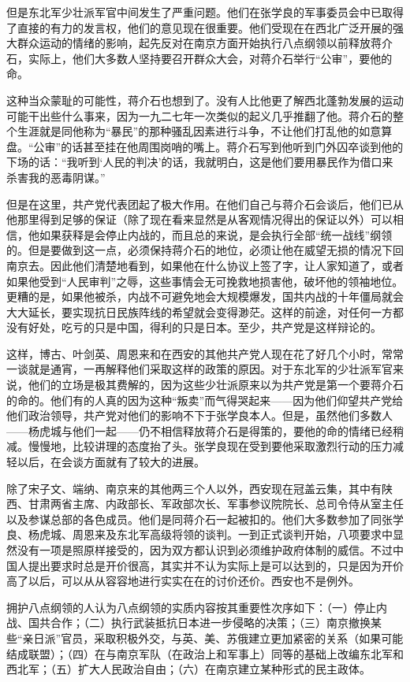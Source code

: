 \documentclass[10pt]{book}
\begin{document}
但是东北军少壮派军官中间发生了严重问题。他们在张学良的军事委员会中已取得了直接的有力的发言权，他们的意见现在很重要。他们受现在在西北广泛开展的强大群众运动的情绪的影响，起先反对在南京方面开始执行八点纲领以前释放蒋介石，实际上，他们大多数人坚持要召开群众大会，对蒋介石举行“公审”，要他的命。

这种当众蒙耻的可能性，蒋介石也想到了。没有人比他更了解西北蓬勃发展的运动可能干出些什么事来，因为一九二七年一次类似的起义几乎推翻了他。蒋介石的整个生涯就是同他称为“暴民”的那种骚乱因素进行斗争，不让他们打乱他的如意算盘。“公审”的话甚至挂在他周围岗哨的嘴上。蒋介石写到他听到门外囚卒谈到他的下场的话：“我听到‘人民的判决’的话，我就明白，这是他们要用暴民作为借口来杀害我的恶毒阴谋。”

但是在这里，共产党代表团起了极大作用。在他们自己与蒋介石会谈后，他们已从他那里得到足够的保证（除了现在看来显然是从客观情况得出的保证以外）可以相信，他如果获释是会停止内战的，而且总的来说，是会执行全部“统一战线”纲领的。但是要做到这一点，必须保持蒋介石的地位，必须让他在威望无损的情况下回南京去。因此他们清楚地看到，如果他在什么协议上签了字，让人家知道了，或者如果他受到“人民审判”之辱，这些事情会无可挽救地损害他，破坏他的领袖地位。更糟的是，如果他被杀，内战不可避免地会大规模爆发，国共内战的十年僵局就会大大延长，要实现抗日民族阵线的希望就会变得渺茫。这样的前途，对任何一方都没有好处，吃亏的只是中国，得利的只是日本。至少，共产党是这样辩论的。

这样，博古、叶剑英、周恩来和在西安的其他共产党人现在花了好几个小时，常常一谈就是通宵，一再解释他们采取这样的政策的原因。对于东北军的少壮派军官来说，他们的立场是极其费解的，因为这些少壮派原来以为共产党是第一个要蒋介石的命的。他们有的人真的因为这种“叛卖”而气得哭起来——因为他们仰望共产党给他们政治领导，共产党对他们的影响不下于张学良本人。但是，虽然他们多数人——杨虎城与他们一起——仍不相信释放蒋介石是得策的，要他的命的情绪已经稍减。慢慢地，比较讲理的态度抬了头。张学良现在受到要他采取激烈行动的压力减轻以后，在会谈方面就有了较大的进展。

除了宋子文、端纳、南京来的其他两三个人以外，西安现在冠盖云集，其中有陕西、甘肃两省主席、内政部长、军政部次长、军事参议院院长、总司令侍从室主任以及参谋总部的各色成员。他们是同蒋介石一起被扣的。他们大多数参加了同张学良、杨虎城、周恩来及东北军高级将领的谈判。一到正式谈判开始，八项要求中显然没有一项是照原样接受的，因为双方都认识到必须维护政府体制的威信。不过中国人提出要求时总是开价很高，其实并不认为实际上是可以达到的，只是因为开价高了以后，可以从从容容地进行实实在在的讨价还价。西安也不是例外。

拥护八点纲领的人认为八点纲领的实质内容按其重要性次序如下：（一）停止内战、国共合作；（二）执行武装抵抗日本进一步侵略的决策；（三）南京撤换某些“亲日派”官员，采取积极外交，与英、美、苏俄建立更加紧密的关系（如果可能结成联盟）；（四）在与南京军队（在政治上和军事上）同等的基础上改编东北军和西北军；（五）扩大人民政治自由；（六）在南京建立某种形式的民主政体。
\end{document}
